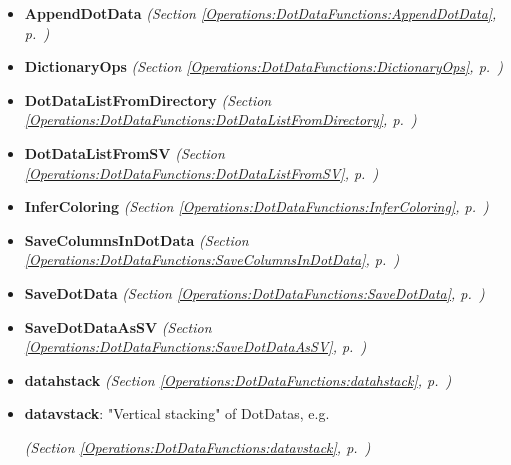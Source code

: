 \begin{itemize}
\setlength{\parskip}{0ex}
\item \textbf{AppendDotData}
  \textit{(Section \ref{Operations:DotDataFunctions:AppendDotData}, p.~\pageref{Operations:DotDataFunctions:AppendDotData})}

\item \textbf{DictionaryOps}
  \textit{(Section \ref{Operations:DotDataFunctions:DictionaryOps}, p.~\pageref{Operations:DotDataFunctions:DictionaryOps})}

\item \textbf{DotDataListFromDirectory}
  \textit{(Section \ref{Operations:DotDataFunctions:DotDataListFromDirectory}, p.~\pageref{Operations:DotDataFunctions:DotDataListFromDirectory})}

\item \textbf{DotDataListFromSV}
  \textit{(Section \ref{Operations:DotDataFunctions:DotDataListFromSV}, p.~\pageref{Operations:DotDataFunctions:DotDataListFromSV})}

\item \textbf{InferColoring}
  \textit{(Section \ref{Operations:DotDataFunctions:InferColoring}, p.~\pageref{Operations:DotDataFunctions:InferColoring})}

\item \textbf{SaveColumnsInDotData}
  \textit{(Section \ref{Operations:DotDataFunctions:SaveColumnsInDotData}, p.~\pageref{Operations:DotDataFunctions:SaveColumnsInDotData})}

\item \textbf{SaveDotData}
  \textit{(Section \ref{Operations:DotDataFunctions:SaveDotData}, p.~\pageref{Operations:DotDataFunctions:SaveDotData})}

\item \textbf{SaveDotDataAsSV}
  \textit{(Section \ref{Operations:DotDataFunctions:SaveDotDataAsSV}, p.~\pageref{Operations:DotDataFunctions:SaveDotDataAsSV})}

\item \textbf{datahstack}
  \textit{(Section \ref{Operations:DotDataFunctions:datahstack}, p.~\pageref{Operations:DotDataFunctions:datahstack})}

\item \textbf{datavstack}: "Vertical stacking" of DotDatas, e.g.



  \textit{(Section \ref{Operations:DotDataFunctions:datavstack}, p.~\pageref{Operations:DotDataFunctions:datavstack})}

\end{itemize}

